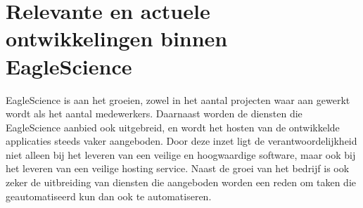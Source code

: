 \section{Relevante en actuele ontwikkelingen binnen EagleScience}\label{sec:relevante-en-actuele-ontwikkelingen-binnen-EagleScience}

EagleScience is aan het groeien, zowel in het aantal projecten waar aan gewerkt wordt als het aantal medewerkers. Daarnaast worden de diensten die EagleScience aanbied ook uitgebreid, en wordt het hosten van de ontwikkelde applicaties steeds vaker aangeboden. Door deze inzet ligt de verantwoordelijkheid niet alleen bij het leveren van een veilige en hoogwaardige software, maar ook bij het leveren van een veilige hosting service. Naast de groei van het bedrijf is ook zeker de uitbreiding van diensten die aangeboden worden een reden om taken die geautomatiseerd kun dan ook te automatiseren.

